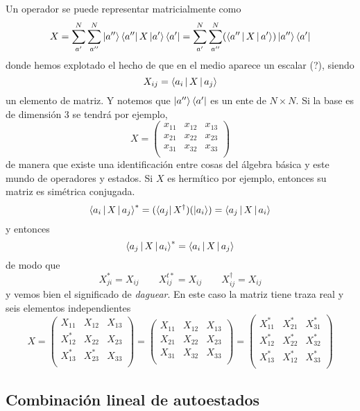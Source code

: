 \documentclass[10pt,oneside]{CBFT_book}
\begin{document}
Un operador se puede representar matricialmente como 
\[
	X = \sum_{a'}^N  \sum_{a''}^N \Ket{a''} \Bra{a''} X \Ket{a'} \Bra{a'} =  
	\sum_{a'}^N  \sum_{a''}^N ( \Braket{a''|X|a'} ) \Ket{a''} \Bra{a'}
\]
donde hemos explotado el hecho de que en el medio aparece un escalar (?), siendo 
\[
	X_{ij} = \Braket{a_i|X|a_j}
\]
un elemento de matriz. Y notemos que $\Ket{a''} \Bra{a'}$ es un ente de $N\times N$.
Si la base es de dimensión 3 se tendrá por ejemplo,
\[
	X = \begin{pmatrix}
	 x_{11} & x_{12} & x_{13} \\
	 x_{21} & x_{22} & x_{23} \\
	 x_{31} & x_{32} & x_{33} \\
	\end{pmatrix}
\]
de manera que existe una identificación entre cosas del álgebra básica y este mundo
de operadores y estados.
Si $X$ es hermítico por ejemplo, entonces su matriz es simétrica conjugada.
\[
	\Braket{a_i|X|a_j}^* = (\Bra{a_j}X^\dagger)(\Ket{a_i}) = \Braket{a_j|X|a_i}
\]
y entonces 
\[
	\Braket{a_j|X|a_i}^* = \Braket{a_i|X|a_j}
\]
de modo que 
\[
	X_{ji}^* = X_{ij} \qquad X_{ij}^{t*} = X_{ij} \qquad X_{ij}^\dagger=X_{ij}
\]
y vemos bien el significado de {\it daguear}. En este caso la matriz tiene traza real
y seis elementos independientes
\[
	X = \begin{pmatrix}
	  X_{11} & X_{12} & X_{13} \\
	  X_{12}^* & X_{22} & X_{23} \\
	  X_{13}^* & X_{23}^* & X_{33} \\
	\end{pmatrix} =
	\begin{pmatrix}
	  X_{11} & X_{12} & X_{13} \\
	  X_{21} & X_{22} & X_{23} \\
	  X_{31} & X_{32} & X_{33} \\
	\end{pmatrix} =
	\begin{pmatrix}
	  X_{11}^* & X_{21}^* & X_{31}^* \\
	  X_{12}^* & X_{22}^* & X_{32}^* \\
	  X_{13}^* & X_{12}^* & X_{33}^* \\
	\end{pmatrix}
\]

\subsection{Combinación lineal de autoestados}
\end{document}
